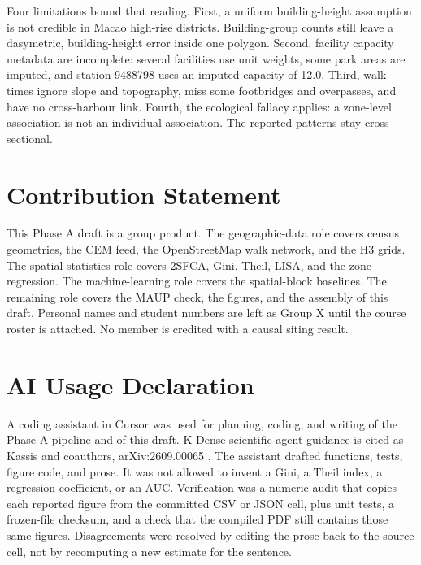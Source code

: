 \documentclass[11pt,a4paper]{article}
\newcommand{\mfourpad}{0pt}
\begin{document}
Four limitations bound that reading. First, a uniform building-height assumption is not credible in Macao high-rise districts. Building-group counts still leave a dasymetric, building-height error inside one polygon. Second, facility capacity metadata are incomplete: several facilities use unit weights, some park areas are imputed, and station 9488798 uses an imputed capacity of 12.0. Third, walk times ignore slope and topography, miss some footbridges and overpasses, and have no cross-harbour link. Fourth, the ecological fallacy applies: a zone-level association is not an individual association. The reported patterns stay cross-sectional.

\vspace*{\mfourpad}




\section*{Contribution Statement}
This Phase A draft is a group product. The geographic-data role covers census geometries, the CEM feed, the OpenStreetMap walk network, and the H3 grids. The spatial-statistics role covers 2SFCA, Gini, Theil, LISA, and the zone regression. The machine-learning role covers the spatial-block baselines. The remaining role covers the MAUP check, the figures, and the assembly of this draft. Personal names and student numbers are left as Group X until the course roster is attached. No member is credited with a causal siting result.

\section*{AI Usage Declaration}
A coding assistant in Cursor was used for planning, coding, and writing of the Phase A pipeline and of this draft. K-Dense scientific-agent guidance is cited as Kassis and coauthors, arXiv:2609.00065 \citep{kassis2026}. The assistant drafted functions, tests, figure code, and prose. It was not allowed to invent a Gini, a Theil index, a regression coefficient, or an AUC. Verification was a numeric audit that copies each reported figure from the committed CSV or JSON cell, plus unit tests, a frozen-file checksum, and a check that the compiled PDF still contains those same figures. Disagreements were resolved by editing the prose back to the source cell, not by recomputing a new estimate for the sentence.
\end{document}
